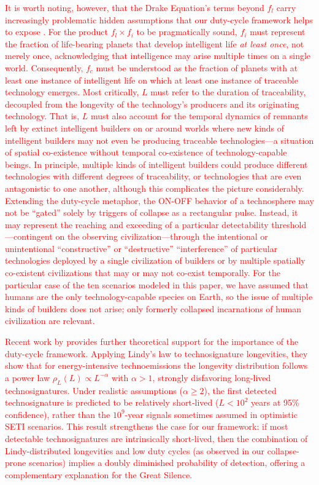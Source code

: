 \textcolor{red}{It is worth noting, however, that the Drake Equation's terms beyond $f_l$ carry increasingly problematic hidden assumptions that our duty-cycle framework helps to expose \citep{Cirkovic2004-em}. For the product $f_l \times f_i$ to be pragmatically sound, $f_i$ must represent the fraction of life-bearing planets that develop intelligent life \emph{at least once}, not merely once, acknowledging that intelligence may arise multiple times on a single world. Consequently, $f_c$ must be understood as the fraction of planets with at least one instance of intelligent life on which at least one instance of traceable technology emerges. Most critically, $L$ must refer to the duration of traceability, decoupled from the longevity of the technology's producers and its originating technology. That is, $L$ must also account for the temporal dynamics of remnants left by extinct intelligent builders on or around worlds where new kinds of intelligent builders may not even be producing traceable technologies---a situation of spatial co-existence without temporal co-existence of technology-capable beings. In principle, multiple kinds of intelligent builders could produce different technologies with different degrees of traceability, or technologies that are even antagonistic to one another, although this complicates the picture considerably. Extending the duty-cycle metaphor, the ON-OFF behavior of a technosphere may not be ``gated'' solely by triggers of collapse as a rectangular pulse. Instead, it may represent the reaching and exceeding of a particular detectability threshold---contingent on the observing civilization---through the intentional or unintentional ``constructive'' or ``destructive'' ``interference'' of particular technologies deployed by a single civilization of builders or by multiple spatially co-existent civilizations that may or may not co-exist temporally. For the particular case of the ten scenarios modeled in this paper, we have assumed that humans are the only technology-capable species on Earth, so the issue of multiple kinds of builders does not arise; only formerly collapsed incarnations of human civilization are relevant.}

\textcolor{red}{Recent work by \citet{Balbi2024-bg} provides further theoretical support for the importance of the duty-cycle framework. Applying Lindy's law to technosignature longevities, they show that for energy-intensive technoemissions the longevity distribution follows a power law $\rho_L(L) \propto L^{-\alpha}$ with $\alpha > 1$, strongly disfavoring long-lived technosignatures. Under realistic assumptions ($\alpha \geq 2$), the first detected technosignature is predicted to be relatively short-lived ($L < 10^2$ years at 95\% confidence), rather than the $10^9$-year signals sometimes assumed in optimistic SETI scenarios. This result strengthens the case for our framework: if most detectable technosignatures are intrinsically short-lived, then the combination of Lindy-distributed longevities and low duty cycles (as observed in our collapse-prone scenarios) implies a doubly diminished probability of detection, offering a complementary explanation for the Great Silence.}

